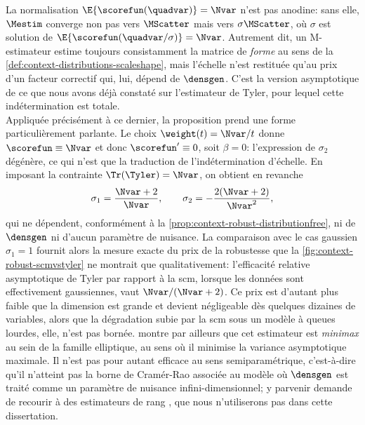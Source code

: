 La normalisation $\E\{\scorefun(\quadvar)\}=\Nvar$ n'est pas anodine: sans elle, $\Mestim$ converge non pas vers $\MScatter$ mais vers $\sigma\MScatter$, où $\sigma$ est solution de $\E\{\scorefun(\quadvar/\sigma)\}=\Nvar$. Autrement dit, un M-estimateur estime toujours consistamment la matrice de \emph{forme} au sens de la \cref{def:context-distributions-scaleshape}, mais l'échelle n'est restituée qu'au prix d'un facteur correctif qui, lui, dépend de $\densgen$. C'est la version asymptotique de ce que nous avons déjà constaté sur l'estimateur de Tyler, pour lequel cette indétermination est totale. \\

Appliquée précisément à ce dernier, la proposition prend une forme particulièrement parlante. Le choix $\weight(t)=\Nvar/t$ donne $\scorefun\equiv\Nvar$ et donc $\scorefun'\equiv 0$, soit $\beta=0$: l'expression de $\sigma_2$ dégénère, ce qui n'est que la traduction de l'indétermination d'échelle. En imposant la contrainte $\Tr(\Tyler)=\Nvar$, on obtient en revanche
\begin{equation}
  \label{eq:context-robust-tylerasymptotic}
  \sigma_1 = \frac{\Nvar+2}{\Nvar},
  \qquad
  \sigma_2 = -\frac{2(\Nvar+2)}{\Nvar^{2}},
\end{equation}
qui ne dépendent, conformément à la \cref{prop:context-robust-distributionfree}, ni de $\densgen$ ni d'aucun paramètre de nuisance. La comparaison avec le cas gaussien $\sigma_1=1$ fournit alors la mesure exacte du prix de la robustesse que la \cref{fig:context-robust-scmvstyler} ne montrait que qualitativement: l'efficacité relative asymptotique de Tyler par rapport à la scm, lorsque les données sont effectivement gaussiennes, vaut $\Nvar/(\Nvar+2)$. Ce prix est d'autant plus faible que la dimension est grande et devient négligeable dès quelques dizaines de variables, alors que la dégradation subie par la scm sous un modèle à queues lourdes, elle, n'est pas bornée.  montre par ailleurs que cet estimateur est \emph{minimax} au sein de la famille elliptique, au sens où il minimise la variance asymptotique maximale. Il n'est pas pour autant efficace au sens semiparamétrique, c'est-à-dire qu'il n'atteint pas la borne de Cramér-Rao associée au modèle où $\densgen$ est traité comme un paramètre de nuisance infini-dimensionnel; y parvenir demande de recourir à des estimateurs de rang , que nous n'utiliserons pas dans cette dissertation.

